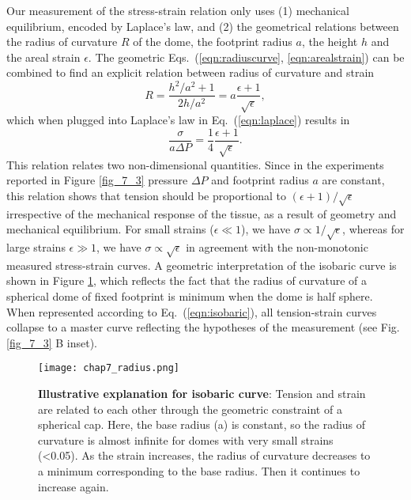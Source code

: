 Our measurement of the stress-strain relation only uses (1) mechanical equilibrium, encoded by Laplace's law, and (2) the geometrical relations between the radius of curvature $R$ of the dome, the footprint radius $a$, the height $h$ and the areal strain $\epsilon$. The geometric Eqs.~(\ref{eqn:radiuscurve}, \ref{eqn:arealstrain}) can be combined to find an explicit relation between radius of curvature and strain
\begin{equation}
	R = \frac{h^2/a^2 + 1}{2h/a^2} = a\frac{\epsilon + 1}{\sqrt{\epsilon}},
\end{equation}
which when plugged into Laplace's law in Eq.~(\ref{eqn:laplace}) results in 
\begin{equation}
	\label{eqn:isobaric}
	\frac{\sigma}{a \Delta P} = \frac{1}{4}  \frac{\epsilon + 1}{\sqrt{\epsilon}}.
\end{equation}
This relation relates two non-dimensional quantities. Since in the experiments reported in Figure \ref{fig_7_3} pressure $\Delta P$ and footprint radius $a$ are constant, this relation shows that tension should be proportional to $(\epsilon + 1)/\sqrt{\epsilon}$ irrespective of the mechanical response of the tissue, as a result of geometry and mechanical equilibrium. For small strains ($\epsilon\ll 1$), we have $\sigma \propto 1/\sqrt{\epsilon}$, whereas for large strains $\epsilon\gg 1$, we have $\sigma \propto \sqrt{\epsilon}$ in agreement with the non-monotonic measured stress-strain curves. A geometric interpretation of the isobaric curve is shown in Figure \ref{fig_7_4}, which reflects the fact that the radius of curvature of a spherical dome of fixed footprint is minimum when the dome is half sphere. When represented according to Eq.~(\ref{eqn:isobaric}), all tension-strain curves collapse to a master curve reflecting the hypotheses of the measurement (see Fig. \ref{fig_7_3} B inset).

\begin{figure}
	\centering
	\texttt{[image: chap7\_radius.png]}
	\caption{\label{fig_7_4} \textbf{Illustrative explanation for isobaric curve}: Tension and strain are related to each other through the geometric constraint of a spherical cap. Here, the base radius (a) is constant, so the radius of curvature is almost infinite for domes with very small strains (<0.05). As the strain increases, the radius of curvature decreases to a minimum corresponding to the base radius. Then it continues to increase again.	
	}
\end{figure}

